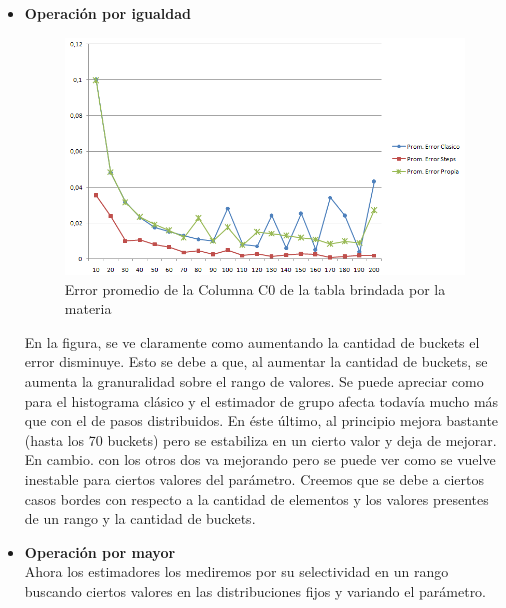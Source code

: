 \begin{itemize}
\item \textbf{Operaci\'on por igualdad} \\

\begin{figure}[H]
	  \begin{center}
	    \includegraphics[scale=.80]{imagenes/parametroVariableC0Eq.png}
	    \caption{Error promedio de la Columna C0 de la tabla brindada por la materia} 
	    \label{fig:C0_variando_parametro}
	  \end{center}
\end{figure}

\quad En la figura, se ve claramente como aumentando la cantidad de buckets el error disminuye. Esto se debe a que, al aumentar la cantidad de buckets, se aumenta la granuralidad sobre el rango de valores. Se puede apreciar como para el histograma cl\'asico y el estimador de grupo afecta todav\'ia mucho m\'as que con el de pasos distribuidos. En \'este \'ultimo, al principio mejora bastante (hasta los 70 buckets) pero se estabiliza en un cierto valor y deja de mejorar. En cambio. con los otros dos va mejorando pero se puede ver como se vuelve inestable para ciertos valores del par\'ametro. Creemos que se debe a ciertos casos bordes con respecto a la cantidad de elementos y los valores presentes de un rango y la cantidad de buckets. \\

\item \textbf{Operaci\'on por mayor} \\

\quad Ahora los estimadores los mediremos por su selectividad en un rango buscando ciertos valores en las distribuciones fijos y variando el par\'ametro. \\


\end{itemize}
